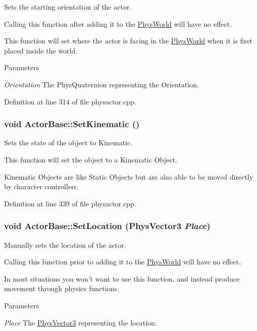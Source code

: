 Sets the starting orientation of the actor. 

Calling this function after adding it to the \hyperlink{classPhysWorld}{PhysWorld} will have no effect. \par
 This function will set where the actor is facing in the \hyperlink{classPhysWorld}{PhysWorld} when it is first placed inside the world. 
\begin{DoxyParams}{Parameters}
\item[{\em Orientation}]The PhysQuaternion representing the Orientation. \end{DoxyParams}


Definition at line 314 of file physactor.cpp.

\hypertarget{classActorBase_a2d5f990e8c6925b7e44e9ec85f379e6a}{
\subsubsection[{SetKinematic}]{\setlength{\rightskip}{0pt plus 5cm}void ActorBase::SetKinematic ()}}
\label{dd/d7b/classActorBase_a2d5f990e8c6925b7e44e9ec85f379e6a}


Sets the state of the object to Kinematic. 

This function will set the object to a Kinematic Object. \par
 Kinematic Objects are like Static Objects but are also able to be moved directly by character controllers. 

Definition at line 339 of file physactor.cpp.

\hypertarget{classActorBase_a2a204add0b036de441ebd59d14939000}{
\subsubsection[{SetLocation}]{\setlength{\rightskip}{0pt plus 5cm}void ActorBase::SetLocation ({\bf PhysVector3} {\em Place})}}
\label{dd/d7b/classActorBase_a2a204add0b036de441ebd59d14939000}


Manually sets the location of the actor. 

Calling this function prior to adding it to the \hyperlink{classPhysWorld}{PhysWorld} will have no effect. \par
 In most situations you won't want to use this function, and instead produce movement through physics functions. 
\begin{DoxyParams}{Parameters}
\item[{\em Place}]The \hyperlink{classPhysVector3}{PhysVector3} representing the location. \end{DoxyParams}


